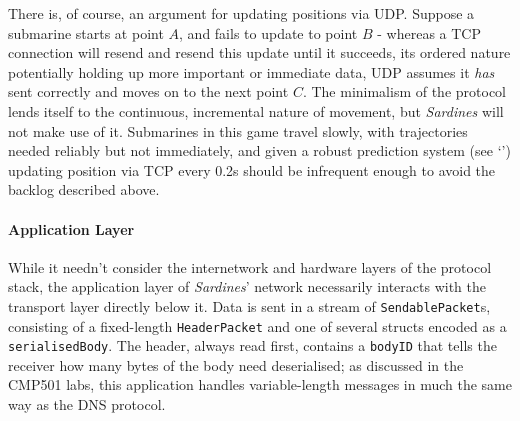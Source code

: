 \documentclass[a4paper, 10pt]{article}
\begin{document}
\begin{flushleft}
\vspace{5pt}\noindent
There is, of course, an argument for updating positions via UDP. Suppose a submarine starts at point $A$, and fails to update to point $B$ - whereas a TCP connection will resend and resend this update until it succeeds, its ordered nature potentially holding up more important or immediate data, UDP assumes it \textit{has} sent correctly and moves on to the next point $C$. The minimalism of the protocol lends itself to the continuous, incremental nature of movement, but \textit{Sardines} will not make use of it. Submarines in this game travel slowly, with trajectories needed reliably but not immediately, and given a robust prediction system (see `') updating position via TCP every 0.2s should be infrequent enough to avoid the backlog described above.

\paragraph{Application Layer} 

While it needn't consider the internetwork and hardware layers of the protocol stack, the application layer of \textit{Sardines}' network necessarily interacts with the transport layer directly below it. Data is sent in a stream of \texttt{SendablePacket}s, consisting of a fixed-length \texttt{HeaderPacket} and one of several structs encoded as a \texttt{serialisedBody}. The header, always read first, contains a \texttt{bodyID}  that tells the receiver how many bytes of the body need deserialised; as discussed in the CMP501 labs, this application handles variable-length messages in much the same way as the DNS protocol.


\end{flushleft}
\end{document}

